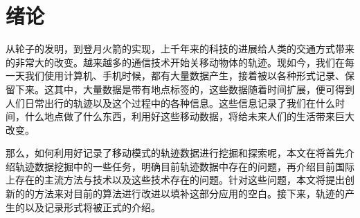 
\chapter{绪论}
\label{chapter:introduction}


从轮子的发明，到登月火箭的实现，上千年来的科技的进展给人类的交通方式带来的非常大的改变。越来越多的通信技术开始关移动物体的轨迹。现如今，我们在每一天我们使用计算机、手机时候，都有大量数据产生，接着被以各种形式记录、保留下来。这其中，大量数据是带有地点标签的，这些数据随着时间扩展，便可得到人们日常出行的轨迹以及这个过程中的各种信息。这些信息记录了我们在什么时间，什么地点做了什么东西，利用好这些移动数据，将给未来人们的生活带来巨大改变。

那么，如何利用好记录了移动模式的轨迹数据进行挖掘和探索呢，本文在将首先介绍轨迹数据挖掘中的一些任务，明确目前轨迹数据中存在的问题，再介绍目前国际上存在的主流方法与技术以及这些技术存在的问题。针对这些问题，本文将提出创新的的方法来对目前的算法进行改进以填补这部分应用的空白。接下来，轨迹的产生的以及记录形式将被正式的介绍。



